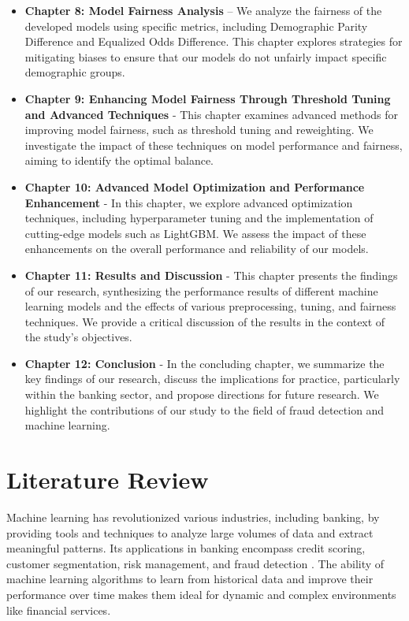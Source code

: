 \documentclass[12pt,a4paper]{report}
\begin{document}
\begin{itemize}
    \item \textbf{Chapter 8: Model Fairness Analysis} – We analyze the fairness of the developed models using specific metrics, including Demographic Parity Difference and Equalized Odds Difference. This chapter explores strategies for mitigating biases to ensure that our models do not unfairly impact specific demographic groups.

    \item \textbf{Chapter 9: Enhancing Model Fairness Through Threshold Tuning and Advanced Techniques} - This chapter examines advanced methods for improving model fairness, such as threshold tuning and reweighting. We investigate the impact of these techniques on model performance and fairness, aiming to identify the optimal balance.

    \item \textbf{Chapter 10: Advanced Model Optimization and Performance Enhancement} - In this chapter, we explore advanced optimization techniques, including hyperparameter tuning and the implementation of cutting-edge models such as LightGBM. We assess the impact of these enhancements on the overall performance and reliability of our models.

    \item \textbf{Chapter 11: Results and Discussion} - This chapter presents the findings of our research, synthesizing the performance results of different machine learning models and the effects of various preprocessing, tuning, and fairness techniques. We provide a critical discussion of the results in the context of the study’s objectives.

    \item \textbf{Chapter 12: Conclusion} - In the concluding chapter, we summarize the key findings of our research, discuss the implications for practice, particularly within the banking sector, and propose directions for future research. We highlight the contributions of our study to the field of fraud detection and machine learning.
\end{itemize}





\chapter{Literature Review}
Machine learning has revolutionized various industries, including banking, by providing tools and techniques to analyze large volumes of data and extract meaningful patterns. Its applications in banking encompass credit scoring, customer segmentation, risk management, and fraud detection \citep[p. 3034]{bao2020detecting, pan2024machine, hashemi2022fraud}. The ability of machine learning algorithms to learn from historical data and improve their performance over time makes them ideal for dynamic and complex environments like financial services.
\end{document}
